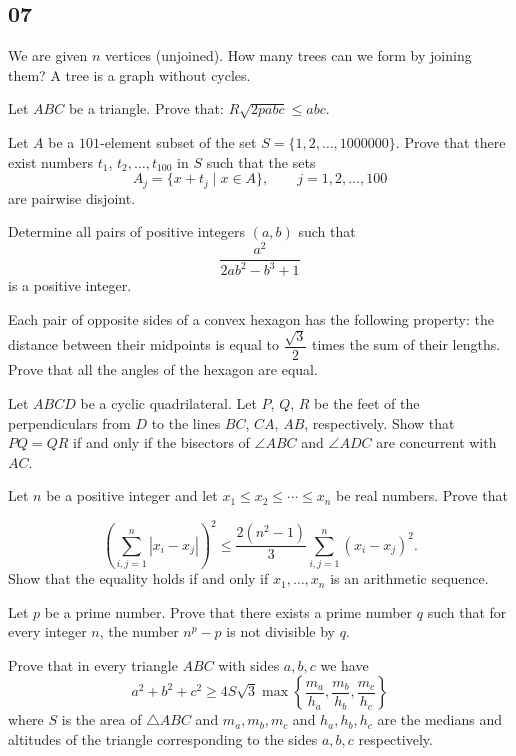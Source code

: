 \newpage
\subsection{07}
\bq{}{}
We are given $n$ vertices (unjoined). How many trees can we form by joining them? A tree is a graph without cycles.
\eq

\bq{}{}
Let $ABC$ be a triangle. Prove that:
$R \sqrt{2pabc} \leq abc$.
\eq

Let $A$ be a $101$-element subset of the set $S=\{1,2,\ldots,1000000\}$. Prove that there exist numbers $t_1$, $t_2, \ldots, t_{100}$ in $S$ such that the sets \[ A_j=\{x+t_j\mid x\in A\},\qquad j=1,2,\ldots,100 \] are pairwise disjoint.
\eq

Determine all pairs of positive integers $(a,b)$ such that \[ \dfrac{a^2}{2ab^2-b^3+1} \] is a positive integer.
\eq

Each pair of opposite sides of a convex hexagon has the following property: the distance between their midpoints is equal to $\dfrac{\sqrt{3}}{2}$ times the sum of their lengths. Prove that all the angles of the hexagon are equal.
\eq

Let $ABCD$ be a cyclic quadrilateral. Let $P$, $Q$, $R$ be the feet of the perpendiculars from $D$ to the lines $BC$, $CA$, $AB$, respectively. Show that $PQ=QR$ if and only if the bisectors of $\angle ABC$ and $\angle ADC$ are concurrent with $AC$.
\eq

Let $n$ be a positive integer and let $x_1\le x_2\le\cdots\le x_n$ be real numbers.
Prove that

\[ \left(\sum_{i,j=1}^{n}|x_i-x_j|\right)^2\le\frac{2(n^2-1)}{3}\sum_{i,j=1}^{n}(x_i-x_j)^2. \]
Show that the equality holds if and only if $x_1, \ldots, x_n$ is an arithmetic sequence.
\eq

Let $p$ be a prime number. Prove that there exists a prime number $q$ such that for every integer $n$, the number $n^p-p$ is not divisible by $q$.
\eq

\bq{}{}
Prove that in every triangle $ABC$ with sides $a,b,c$ we have
\[a^2+b^2+c^2 \ge 4S\sqrt3\max\left\{\frac{m_a}{h_a}, \frac{m_b}{h_b}, \frac{m_c}{h_c} \right\}\]
where $S$ is the area of $\triangle ABC$ and $m_a, m_b, m_c$ and $h_a, h_b, h_c$ are the medians and altitudes of the triangle corresponding to the sides $a,b,c$ respectively.
\eq

